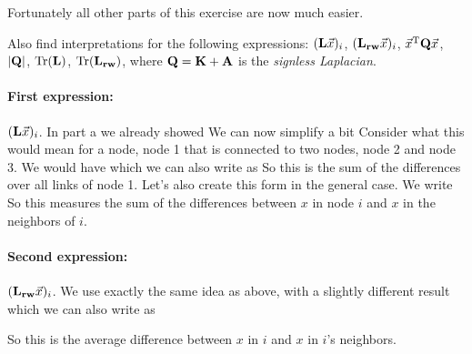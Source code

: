 Fortunately all other parts of this exercise are now much easier. 

\subquestion
Also find interpretations for the following expressions: $({\bf L}\vec{x})_i$, $({\bf L_{rw}}\vec{x})_i$, $\vec{x}^{\rm T} {\bf Q} \vec{x}$,  $|{\bf Q}|$, $\rm Tr(\bf L)$, $\rm Tr(\bf L_{rw})$, where $\bf Q={\bf K}+{\bf A}$ is the \emph{signless Laplacian}.

\solution
\paragraph{First expression:} $({\bf L} \vec{x})_i$. In part a we already showed 
We can now simplify a bit 
Consider what this would mean for a node, node 1 that is connected to two nodes, node 2 and node 3. We would have 
which we can also write as 
So this is the sum of the differences over all links of node 1. Let's also create this form in the general case. We write 
So this measures the sum of the differences between $x$ in node $i$ and $x$ in the neighbors of $i$. 

\paragraph{Second expression:} $({\bf L_{rw}}\vec{x})_i$.
We use exactly the same idea as above, with a slightly different result 
which we can also write as 

So this is the average difference between $x$ in $i$ and $x$ in $i$'s neighbors. 

